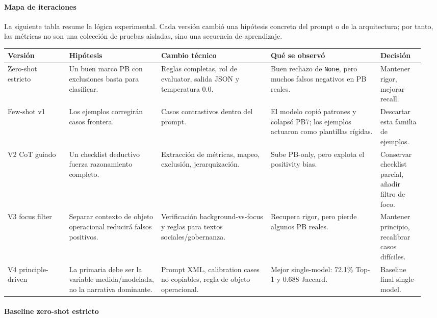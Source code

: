 \paragraph*{Mapa de iteraciones}

La siguiente tabla resume la lógica experimental. Cada versión cambió una hipótesis concreta del prompt o de la arquitectura; por tanto, las métricas no son una colección de pruebas aisladas, sino una secuencia de aprendizaje.

\begin{center}
\scriptsize
\setlength{\tabcolsep}{3pt}
\renewcommand{\arraystretch}{1.18}
\begin{tabular}{p{0.14\linewidth}p{0.21\linewidth}p{0.25\linewidth}p{0.25\linewidth}p{0.10\linewidth}}
\toprule
Versión & Hipótesis & Cambio técnico & Qué se observó & Decisión \\
\midrule
Zero-shot estricto & Un buen marco PB con exclusiones basta para clasificar. & Reglas completas, rol de evaluator, salida JSON y temperatura 0.0. & Buen rechazo de \texttt{None}, pero muchos falsos negativos en PB reales. & Mantener rigor, mejorar recall. \\
Few-shot v1 & Los ejemplos corregirán casos frontera. & Casos contrastivos dentro del prompt. & El modelo copió patrones y colapsó PB7; los ejemplos actuaron como plantillas rígidas. & Descartar esta familia de ejemplos. \\
V2 CoT guiado & Un checklist deductivo fuerza razonamiento completo. & Extracción de métricas, mapeo, exclusión, jerarquización. & Sube PB-only, pero explota el positivity bias. & Conservar checklist parcial, añadir filtro de foco. \\
V3 focus filter & Separar contexto de objeto operacional reducirá falsos positivos. & Verificación background-vs-focus y reglas para textos sociales/gobernanza. & Recupera rigor, pero pierde algunos PB reales. & Mantener principio, recalibrar casos difíciles. \\
V4 principle-driven & La primaria debe ser la variable medida/modelada, no la narrativa dominante. & Prompt XML, calibration cases no copiables, regla de objeto operacional. & Mejor single-model: 72.1\% Top-1 y 0.688 Jaccard. & Baseline final single-model. \\
\bottomrule
\end{tabular}
\end{center}

\paragraph*{Baseline zero-shot estricto}

